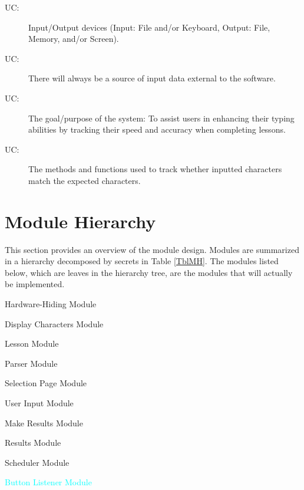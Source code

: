 \documentclass[12pt, titlepage]{article}
\newcounter{ucnum}
\newcommand{\uctheucnum}{UC\theucnum}
\newcounter{mnum}
\newcommand{\mthemnum}{M\themnum}
\begin{document}
\begin{description}
\item[ \uctheucnum \label{ucIO}:] Input/Output devices (Input: File and/or Keyboard, Output: File, Memory, and/or Screen).
\item[ \uctheucnum \label{ucInput}:] There will always be a source of input data external to the software.
\item[ \uctheucnum \label{ucInput}:] The goal/purpose of the system: To assist users in enhancing their typing abilities by tracking their speed and accuracy when completing lessons. 
\item[ \uctheucnum \label{ucInput}:] The methods and functions used to track whether inputted characters match the expected characters. 
\end{description}

\section{Module Hierarchy} \label{SecMH}

This section provides an overview of the module design. Modules are summarized
in a hierarchy decomposed by secrets in Table \ref{TblMH}. The modules listed
below, which are leaves in the hierarchy tree, are the modules that will
actually be implemented.

\begin{description}
\item [ \mthemnum \label{mHH}:] Hardware-Hiding Module
\item [ \mthemnum \label{mDC}:] Display Characters Module
\item [ \mthemnum \label{mL}:] Lesson Module
\item [ \mthemnum \label{mP}:] Parser Module
\item [ \mthemnum \label{mSP}:] Selection Page Module
\item [ \mthemnum \label{mUI}:] User Input Module
\item [ \mthemnum \label{mMR}:] Make Results Module
\item [ \mthemnum \label{mR}:] Results Module
\item [ \mthemnum \label{mS}:] Scheduler Module
\textcolor{cyan}{
\item [\refstepcounter{mnum} \mthemnum \label{mBL}:]{Button Listener Module}}
\end{description}
\end{document}
